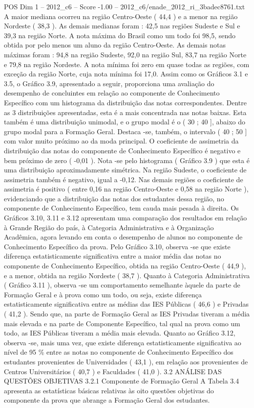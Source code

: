 \begin{textsample}{POS Dim 1 – 2012\_c6 – Score -1.00 – 2012\_c6/enade\_2012\_ri\_3badec8761.txt}
A maior mediana ocorreu na região Centro-Oeste ( 44,4 ) e a menor na região Nordeste ( 38,3 ).
As demais medianas foram : 42,5 nas regiões Sudeste e Sul e 39,3 na região Norte.
A nota máxima do Brasil como um todo foi 98,5, sendo obtida por pelo menos um aluno da região Centro-Oeste.
As demais notas máximas foram : 94,8 na região Sudeste, 92,0 na região Sul, 83,7 na região Norte e 79,8 na região Nordeste.
A nota mínima foi zero em quase todas as regiões, com exceção da região Norte, cuja nota mínima foi 17,0.
Assim como os Gráficos 3.1 e 3.5, o Gráfico 3.9, apresentado a seguir, proporciona uma avaliação do desempenho de concluintes em relação ao componente de Conhecimento Específico com um histograma da distribuição das notas correspondentes.
Dentre as 3 distribuições apresentadas, esta é a mais concentrada nas notas baixas.
Esta também é uma distribuição unimodal, e o grupo modal é o ( 30 ; 40 ], abaixo do grupo modal para a Formação Geral.
Destaca -se, também, o intervalo ( 40 ; 50 ] com valor muito próximo ao da moda principal.
O coeficiente de assimetria da distribuição das notas do componente de Conhecimento Específico é negativo e bem próximo de zero ( -0,01 ).
Nota -se pelo histograma ( Gráfico 3.9 ) que esta é uma distribuição aproximadamente simétrica.
Na região Sudeste, o coeficiente de assimetria também é negativo, igual a -0,12.
Nas demais regiões o coeficiente de assimetria é positivo ( entre 0,16 na região Centro-Oeste e 0,58 na região Norte ), evidenciando que a distribuição das notas dos estudantes dessa região, no componente de Conhecimento Específico, tem cauda mais pesada à direita.
Os Gráficos 3.10, 3.11 e 3.12 apresentam uma comparação dos resultados em relação à Grande Região do país, à Categoria Administrativa e à Organização Acadêmica, agora levando em conta o desempenho de alunos no componente de Conhecimento Específico da prova.
Pelo Gráfico 3.10, observa -se que existe diferença estatisticamente significativa entre a maior média das notas no componente de Conhecimento Específico, obtida na região Centro-Oeste ( 44,9 ), e a menor, obtida na região Nordeste ( 38,7 ).
Quanto à Categoria Administrativa ( Gráfico 3.11 ), observa -se um comportamento semelhante àquele da parte de Formação Geral e à prova como um todo, ou seja, existe diferença estatisticamente significativa entre as médias das IES Públicas ( 46,6 ) e Privadas ( 41,2 ).
Sendo que, na parte de Formação Geral as IES Privadas tiveram a média mais elevada e na parte de Componente Específico, tal qual na prova como um todo, as IES Públicas tiveram a média mais elevada.
Quanto ao Gráfico 3.12, observa -se, mais uma vez, que existe diferença estatisticamente significativa ao nível de 95 \% entre as notas no componente de Conhecimento Específico dos estudantes provenientes de Universidades ( 43,1 ), em relação aos provenientes de Centros Universitários ( 40,7 ) e Faculdades ( 41,0 ). 3.2 ANÁLISE DAS QUESTÕES OBJETIVAS 3.2.1 Componente de Formação Geral A Tabela 3.4 apresenta as estatísticas básicas relativas às oito questões objetivas do componente da prova que abrange a Formação Geral dos estudantes.

\end{textsample}
